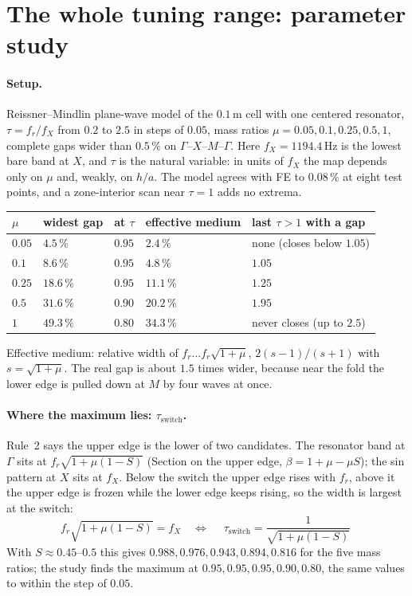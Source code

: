 \section{The whole tuning range: parameter study}
\label{sec:parameter_study}

\paragraph{Setup.} Reissner--Mindlin plane-wave model of the $0.1\,\mathrm{m}$ cell
with one centered resonator, $\tau = f_r/f_X$ from $0.2$ to $2.5$ in steps of $0.05$,
mass ratios $\mu = 0.05, 0.1, 0.25, 0.5, 1$, complete gaps wider than $0.5\,\%$ on
$\Gamma$--$X$--$M$--$\Gamma$. Here $f_X = 1194.4\,\mathrm{Hz}$ is the lowest bare band
at $X$, and $\tau$ is the natural variable: in units of $f_X$ the map depends only on
$\mu$ and, weakly, on $h/a$. The model agrees with FE to $0.08\,\%$ at eight test
points, and a zone-interior scan near $\tau = 1$ adds no extrema.

\begin{center}
\begin{tabular}{|l|l|l|l|l|}
\hline
$\mu$ & widest gap & at $\tau$ & effective medium & last $\tau > 1$ with a gap \\
\hline
$0.05$ & $4.5\,\%$ & $0.95$ & $2.4\,\%$ & none (closes below $1.05$) \\
$0.1$ & $8.6\,\%$ & $0.95$ & $4.8\,\%$ & $1.05$ \\
$0.25$ & $18.6\,\%$ & $0.95$ & $11.1\,\%$ & $1.25$ \\
$0.5$ & $31.6\,\%$ & $0.90$ & $20.2\,\%$ & $1.95$ \\
$1$ & $49.3\,\%$ & $0.80$ & $34.3\,\%$ & never closes (up to $2.5$) \\
\hline
\end{tabular}
\end{center}
Effective medium: relative width of $f_r \dots f_r\sqrt{1+\mu}$,
$2(s-1)/(s+1)$ with $s = \sqrt{1+\mu}$. The real gap is about $1.5$ times wider,
because near the fold the lower edge is pulled down at $M$ by four waves at once.

\paragraph{Where the maximum lies: $\tau_\text{switch}$.} Rule~2 says the upper edge is
the lower of two candidates. The resonator band at $\Gamma$ sits at
$f_r\sqrt{1 + \mu(1-S)}$ (Section on the upper edge, $\beta = 1 + \mu - \mu S$); the
sin pattern at $X$ sits at $f_X$. Below the switch the upper edge rises with $f_r$,
above it the upper edge is frozen while the lower edge keeps rising, so the width is
largest at the switch:
\begin{equation}
  f_r\sqrt{1 + \mu(1-S)} = f_X
  \quad\Longleftrightarrow\quad
  \boxed{\;\tau_\text{switch} = \frac{1}{\sqrt{1 + \mu(1-S)}}\;}
\end{equation}
With $S \approx 0.45$--$0.5$ this gives $0.988, 0.976, 0.943, 0.894, 0.816$ for the five
mass ratios; the study finds the maximum at $0.95, 0.95, 0.95, 0.90, 0.80$, the same
values to within the step of $0.05$.

